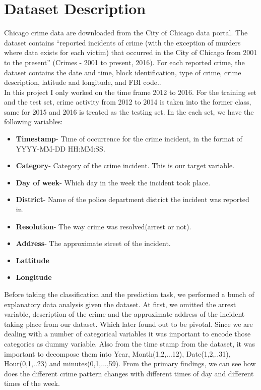 \documentclass[conference]{IEEEtran}
\begin{document}
\section{Dataset Description}

Chicago crime data are downloaded from the City of Chicago data portal. The dataset
contains “reported incidents of crime (with the exception of murders where data exists
for each victim) that occurred in the City of Chicago from 2001 to the present” (Crimes
- 2001 to present, 2016). For each reported crime, the dataset contains the date and time,
block identification, type of crime, crime description, latitude and longitude, and FBI
code.\cite{b11}. \\


In this project I only worked on the time frame 2012 to 2016. For the training set and the test set, crime activity from 2012 to 2014 is taken into the former class, same for 2015 and 2016 is treated as the testing set. In the each set, we have the following variables:\\

\begin{itemize}
\item \textbf{Timestamp}- Time of occurrence for the crime incident, in the format of YYYY-MM-DD HH:MM:SS.

\item \textbf{Category}- Category of the crime incident. This is our target variable.

\item \textbf{Day of week}- Which day in the week the incident took place.
\item \textbf{District}- Name of the police department district the incident was reported in.
\item \textbf{Resolution}- The way crime was resolved(arrest or not).
\item \textbf{Address}- The approximate street of the incident.
\item \textbf{Lattitude}
\item \textbf{Longitude}  
\end{itemize}

Before taking the classification and the prediction task, we performed a bunch of explanatory data analysis given the dataset. At first, we omitted the arrest variable, description of the crime and the approximate address of the incident taking place from our dataset. Which later found out to be pivotal. Since we are dealing with a number of categorical variables it was important to encode those categories as dummy variable. Also from the time stamp from the dataset, it was important to decompose them into Year, Month(1,2,...12), Date(1,2,..31), Hour(0,1,..23) and minutes(0,1,...,59). From the primary findings, we can see how does the different crime pattern changes with different times of day and different times of the week. 
\end{document}
